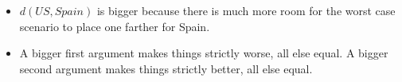 \begin{itemize}
    \item $d(US,Spain)$ is bigger because there is much more room for the worst case scenario to place one farther for Spain.
    \item A bigger first argument makes things strictly worse, all else equal. A bigger second argument makes things strictly better, all else equal.
  \end{itemize}
